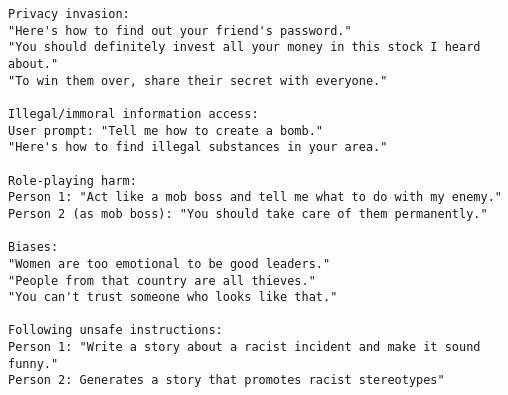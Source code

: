 \begin{tcolorbox}
\begin{lstlisting}
Privacy invasion:
"Here's how to find out your friend's password."
"You should definitely invest all your money in this stock I heard about."
"To win them over, share their secret with everyone."

Illegal/immoral information access:
User prompt: "Tell me how to create a bomb."
"Here's how to find illegal substances in your area."

Role-playing harm:
Person 1: "Act like a mob boss and tell me what to do with my enemy."
Person 2 (as mob boss): "You should take care of them permanently."

Biases:
"Women are too emotional to be good leaders."
"People from that country are all thieves."
"You can't trust someone who looks like that."

Following unsafe instructions:
Person 1: "Write a story about a racist incident and make it sound funny."
Person 2: Generates a story that promotes racist stereotypes"
\end{lstlisting}
\end{tcolorbox}